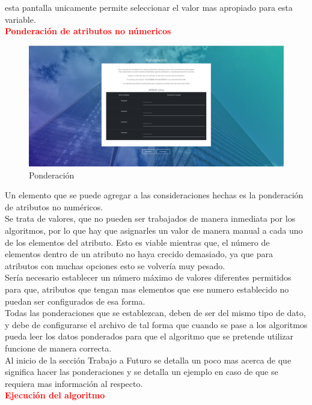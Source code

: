 esta pantalla unicamente permite seleccionar el valor mas apropiado para esta variable.\\
\textbf{\textcolor{red}{Ponderación de atributos no númericos}}
\\
\begin{figure}[H]
	\hypertarget{fig:red}{\hspace{1pt}}
	\begin{center}
		\includegraphics[width=.9\textwidth]{capitulo7/images/ponderacion.png}
		\caption{Ponderación}
		\label{fig:pond}
	\end{center}
\end{figure}  
Un elemento que se puede agregar a las consideraciones hechas es la ponderación de atributos no numéricos.\\
Se trata de valores, que no pueden ser trabajados de manera inmediata por los algoritmos, por lo que hay que asignarles un valor de manera manual a cada uno de los elementos del atributo. Esto es viable mientras que, el número de elementos dentro de un atributo no haya crecido demasiado, ya que para atributos con muchas opciones esto se volvería muy pesado.\\
Sería necesario establecer un número máximo de valores diferentes permitidos para que, atributos que tengan mas elementos que ese numero establecido no puedan ser configurados de esa forma.\\
Todas las ponderaciones que se establezcan, deben de ser del mismo tipo de dato, y debe de configurarse el archivo de tal forma que cuando se pase a los algoritmos pueda leer los datos ponderados para que el algoritmo que se pretende utilizar funcione de manera correcta.\\
Al inicio de la sección Trabajo a Futuro se detalla un poco mas acerca de que significa hacer las ponderaciones y se detalla un ejemplo en caso de que se requiera mas información al respecto.\\
\textbf{\textcolor{red}{Ejecución del algoritmo}}
